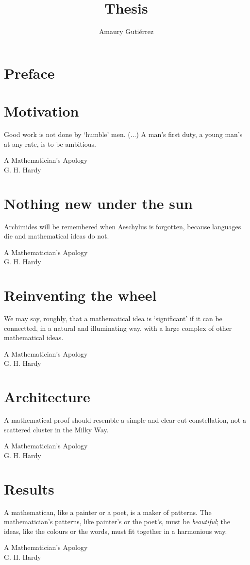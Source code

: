 \documentclass[12pt,letterpaper]{book}
\author{Amaury Guti\'errez}
\title{Thesis}
\theoremstyle{definition} \newtheorem{definition}{Definición}[section]
\theoremstyle{plain} \newtheorem{theorem}{Teorema}[section]
\theoremstyle{plain} \newtheorem{lemma}{Lema}[section]
\theoremstyle{plain} \newtheorem{proposition}[theorem]{Proposici\'on}
\theoremstyle{plain} \newtheorem{corollary}[theorem]{Corolario}
\theoremstyle{plain} \newtheorem{remark}[theorem]{Comentario}
\begin{document}
\frontmatter
 



\frontmatter
\tableofcontents
\chapter{Preface}


\mainmatter

\chapter{Motivation}
\epigraph{Good work is not done by `humble' men. (...) A man's first duty, a young man's at any rate, is to be ambitious.}{A Mathematician's Apology \\ G. H. Hardy}


\chapter{Nothing new under the sun}
\epigraph{Archimides will be remembered when Aeschylus is forgotten, because languages die and mathematical ideas do not.}{A Mathematician's Apology \\ G. H. Hardy}


\chapter{Reinventing the wheel}
\epigraph{We may say, roughly, that a mathematical idea is `significant' if it can be connectted, in a natural and illuminating way, with a large complex of other mathematical ideas.}{A Mathematician's Apology \\ G. H. Hardy}


\chapter{Architecture}
\epigraph{A mathematical proof should resemble a simple and clear-cut constellation, not a scattered cluster in the Milky Way.}{A Mathematician's Apology \\ G. H. Hardy}


\chapter{Results}
\epigraph{A mathematican, like a painter or a poet, is a maker of patterns. The mathematician's patterns, like painter's or the poet's, must be \emph{beautiful}; the ideas, like the colours or the words, must fit together in a harmonious way.}{A Mathematician's Apology \\ G. H. Hardy}

\end{document}

